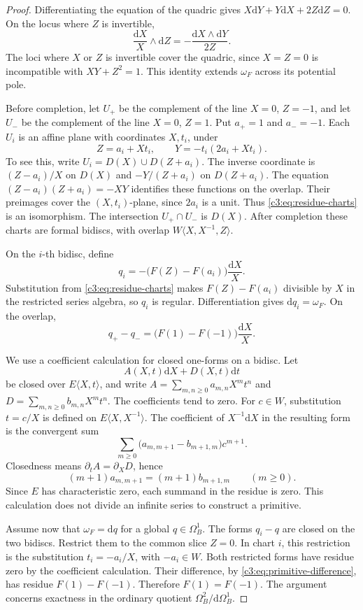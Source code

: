 \documentclass[11pt,a4paper]{amsart}
\numberwithin{equation}{section}
\theoremstyle{definition}
\theoremstyle{remark}
\newcommand{\Cthreedd}{\mathrm{d}}
\begin{document}
\begin{proof}
Differentiating the equation of the quadric gives
$X\Cthreedd Y+Y\Cthreedd X+2Z\Cthreedd Z=0$.
On the locus where $Z$ is invertible,
\[
 \frac{\Cthreedd X}{X}\wedge\Cthreedd Z
   =-\frac{\Cthreedd X\wedge\Cthreedd Y}{2Z}.
\]
The loci where $X$ or $Z$ is invertible cover the quadric, since
$X=Z=0$ is incompatible with $XY+Z^2=1$.
This identity extends $\omega_F$ across its potential pole.

Before completion, let $U_+$ be the complement of the line
$X=0$, $Z=-1$, and let $U_-$ be the complement of the line
$X=0$, $Z=1$.
Put $a_+=1$ and $a_-=-1$.
Each $U_i$ is an affine plane with coordinates $X,t_i$, under
\begin{equation}\label{c3:eq:residue-charts}
 Z=a_i+Xt_i,\qquad
 Y=-t_i(2a_i+Xt_i).
\end{equation}
To see this, write $U_i=D(X)\cup D(Z+a_i)$.
The inverse coordinate is
$(Z-a_i)/X$ on $D(X)$ and $-Y/(Z+a_i)$ on $D(Z+a_i)$.
The equation $(Z-a_i)(Z+a_i)=-XY$ identifies these functions on the
overlap.
Their preimages cover the $(X,t_i)$-plane, since $2a_i$ is a unit.
Thus \eqref{c3:eq:residue-charts} is an isomorphism.
The intersection $U_+\cap U_-$ is $D(X)$.
After completion these charts are formal bidiscs, with overlap
$W\langle X,X^{-1},Z\rangle$.

On the $i$-th bidisc, define
\[
 q_i=-\bigl(F(Z)-F(a_i)\bigr)\frac{\Cthreedd X}{X}.
\]
Substitution from \eqref{c3:eq:residue-charts} makes
$F(Z)-F(a_i)$ divisible by $X$ in the restricted series algebra, so
$q_i$ is regular.
Differentiation gives $\Cthreedd q_i=\omega_F$.
On the overlap,
\begin{equation}\label{c3:eq:primitive-difference}
 q_+-q_-=\bigl(F(1)-F(-1)\bigr)\frac{\Cthreedd X}{X}.
\end{equation}

We use a coefficient calculation for closed one-forms on a bidisc.
Let
\[
 A(X,t)\Cthreedd X+D(X,t)\Cthreedd t
\]
be closed over $E\langle X,t\rangle$, and write
$A=\sum_{m,n\geq0}a_{m,n}X^mt^n$ and
$D=\sum_{m,n\geq0}b_{m,n}X^mt^n$.
The coefficients tend to zero.
For $c\in W$, substitution $t=c/X$ is defined on
$E\langle X,X^{-1}\rangle$.
The coefficient of $X^{-1}\Cthreedd X$ in the resulting form is the
convergent sum
\[
 \sum_{m\geq0}
       \bigl(a_{m,m+1}-b_{m+1,m}\bigr)c^{m+1}.
\]
Closedness means $\partial_t A=\partial_X D$, hence
\[
 (m+1)a_{m,m+1}=(m+1)b_{m+1,m}
 \qquad(m\geq0).
\]
Since $E$ has characteristic zero, each summand in the residue is
zero. This calculation does not divide an infinite series to
construct a primitive.

Assume now that $\omega_F=\Cthreedd q$ for a global
$q\in\Omega_B^1$.
The forms $q_i-q$ are closed on the two bidiscs.
Restrict them to the common slice $Z=0$.
In chart $i$, this restriction is the substitution
$t_i=-a_i/X$, with $-a_i\in W$.
Both restricted forms have residue zero by the coefficient
calculation.
Their difference, by \eqref{c3:eq:primitive-difference}, has residue
$F(1)-F(-1)$.
Therefore $F(1)=F(-1)$.
The argument concerns exactness in the ordinary quotient
$\Omega_B^2/\Cthreedd\Omega_B^1$.
\end{proof}
\end{document}
